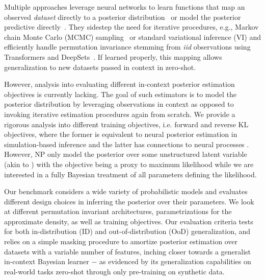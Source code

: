 Multiple approaches leverage neural networks to learn functions that map an observed \emph{dataset} directly to a posterior distribution~\citep{garnelo2018neural,cranmer2020sbireview} or model the posterior predictive directly~\citep{garnelo2018conditional,muller2021transformers,garg2022can,hollmann2022tabpfn}. They sidestep the need for iterative procedures, e.g., Markov chain Monte Carlo (MCMC) sampling~\citep{gelfand2000gibbs,hoffman2014no} or standard variational inference (VI) and efficiently handle permutation invariance stemming from \textit{iid} observations using Transformers and DeepSets~\citep{Zaheer2017deepsets,vaswani2017attention,lee2019set}. If learned properly, this mapping allows generalization to new datasets passed in context in zero-shot.

However, analysis into evaluating different in-context posterior estimation objectives is currently lacking. The goal of such estimators is to model the posterior distribution by leveraging observations in context as opposed to invoking iterative estimation procedures again from scratch. We provide a rigorous analysis into different training objectives, i.e. forward and reverse KL objectives, where the former is equivalent to neural posterior estimation in simulation-based inference \citep{cranmer2020sbireview} and the latter has connections to neural processes \citep{garnelo2018neural}. However, NP only model the posterior over some unstructured latent variable (akin to \citet{kingma2013auto,rezende2014stochastic}) with the objective being a proxy to maximum likelihood while we are interested in a fully Bayesian treatment of all parameters defining the likelihood.

Our benchmark considers a wide variety of probabilistic models and evaluates different design choices in inferring the posterior over their parameters. We look at different permutation invariant architectures, parametrizations for the approximate density, as well as training objectives. Our evaluation criteria tests for both in-distribution (ID) and out-of-distribution (OoD) generalization, and relies on a simple masking procedure to amortize posterior estimation over datasets with a variable number of features, inching closer towards a generalist in-context Bayesian learner $-$ as evidenced by its generalization capabilities on real-world tasks zero-shot through only pre-training on synthetic data.

